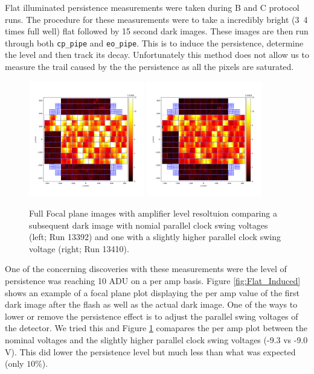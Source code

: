 \documentclass[DM,authoryear,toc]{lsstdoc}
\begin{document}
Flat illuminated persistence measurements were taken during B and C protocol runs.
The procedure for these measurements were to take a incredibly bright (3~4 times full well) flat followed by 15 second dark images.
These images are then run through both \texttt{cp_pipe} and \texttt{eo_pipe}.
This is to induce the persistence, determine the level and then track its decay.
Unfortunately this method does not allow us to measure the trail caused by the the persistence as all the pixels are saturated.

\begin{figure}[!htp]
  \centering
  \includegraphics[width=0.45\textwidth, angle=0]{Run_13392_Persistence.png}
  \includegraphics[width=0.45\textwidth, angle=0]{Run_13410_Persistence_Lower.png}
  \caption{
  Full Focal plane images with amplifier level resoltuion comparing a subsequent dark image with nomial parallel clock swing voltages (left; Run 13392) 
  and one with a slightly higher parallel clock swing voltage (right; Run 13410).
  }\label{fig:Flat_Induced_Comparison}
\end{figure}

One of the concerning discoveries with these measurements were the level of persistence was reaching 10 ADU on a per amp basis.
Figure \ref{fig:Flat_Induced} shows an example of a focal plane plot displaying the per amp value of the first dark image after the flash as well as the actual dark image.
One of the ways to lower or remove the persistence effect is to adjust the parallel swing voltages of the detector.
We tried this and Figure \ref{fig:Flat_Induced_Comparison} comapares the per amp plot between the nominal voltages and the slightly higher parallel clock swing voltages (-9.3 vs -9.0 V).
This did lower the persistence level but much less than what was expected (only $10\%$).
\end{document}
